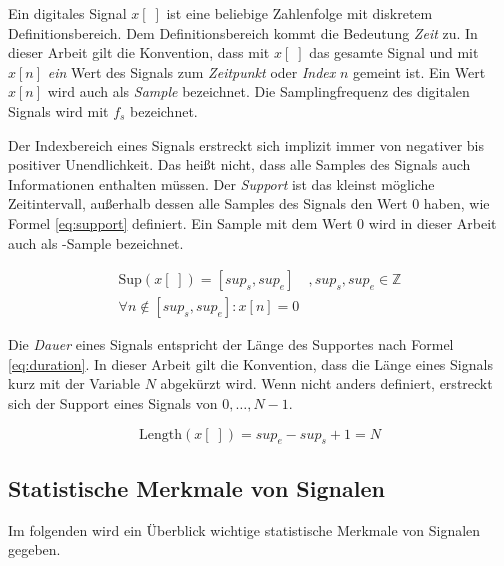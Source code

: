 Ein digitales Signal $x[\;]$ ist eine beliebige Zahlenfolge mit diskretem Definitionsbereich. Dem Definitionsbereich kommt die Bedeutung \emph{Zeit} zu.\cite[S. 11-12]{dspGuide} In dieser Arbeit gilt die Konvention, dass mit $x[\;]$ das gesamte Signal und mit $x[n]$ \emph{ein} Wert des Signals zum \emph{Zeitpunkt} oder \emph{Index} $n$ gemeint ist. Ein Wert $x[n]$ wird auch als \emph{Sample} bezeichnet. Die Samplingfrequenz des digitalen Signals wird mit $f_s$ bezeichnet.

Der Indexbereich eines Signals erstreckt sich implizit immer von negativer bis positiver Unendlichkeit. Das heißt nicht, dass alle Samples des Signals auch Informationen enthalten müssen. Der \emph{Support} ist das kleinst mögliche Zeitintervall, außerhalb dessen alle Samples des Signals den Wert 0 haben, wie Formel \ref{eq:support} definiert. Ein Sample mit dem Wert 0 wird in dieser Arbeit auch als -Sample\grqq{} bezeichnet.\cite[S. 24]{dspMichigan}

\begin{equation}
\label{eq:support}
\begin{split}
\text{Sup}(x[\;]) = [sup_s, sup_e] \quad , sup_s, sup_e \in \mathbb{Z} \\  \forall n \not\in [sup_s, sup_e] : x[n] = 0
\end{split}
\end{equation}

Die \emph{Dauer} eines Signals entspricht der Länge des Supportes nach Formel \ref{eq:duration}. In dieser Arbeit gilt die Konvention, dass die Länge eines Signals kurz mit der Variable $N$ abgekürzt wird. Wenn nicht anders definiert, erstreckt sich der Support eines Signals von $0 ,\ldots, N-1$.\cite[S. 24]{dspMichigan}

\begin{equation}
\text{Length}(x[\;]) = sup_e - sup_s + 1 = N
\label{eq:duration}
\end{equation}


\subsection{Statistische Merkmale von Signalen}

Im folgenden wird ein Überblick wichtige statistische Merkmale von Signalen gegeben.

